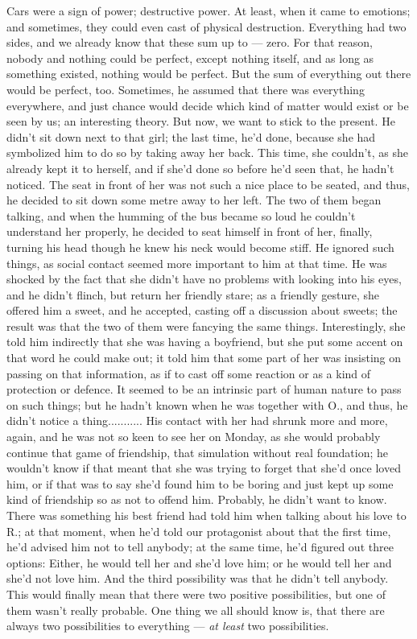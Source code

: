 Cars were a sign of power; destructive power. At least, when it came to emotions; and sometimes, they could even cast of physical destruction. Everything had two sides, and we already know that these sum up to --- zero. 
For that reason, nobody and nothing could be perfect, except nothing itself, and as long as something existed, nothing would be perfect. But the sum of everything out there would be perfect, too. 
Sometimes, he assumed that there was everything everywhere, and just chance would decide which kind of matter would exist or be seen by us; an interesting theory. 
But now, we want to stick to the present. 
He didn't sit down next to that girl; the last time, he'd done, because she had symbolized him to do so by taking away her back. This time, she couldn't, as she already kept it to herself, and if she'd done so before he'd seen that, he hadn't noticed. The seat in front of her was not such a nice place to be seated, and thus, he decided to sit down some metre away to her left. 
The two of them began talking, and when the humming of the bus became so loud he couldn't understand her properly, he decided to seat himself in front of her, finally, turning his head though he knew his neck would become stiff. He ignored such things, as social contact seemed more important to him at that time. He was shocked by the fact that she didn't have no problems with looking into his eyes, and he didn't flinch, but return her friendly stare; as a friendly gesture, she offered him a sweet, and he accepted, casting off a discussion about sweets; the result was that the two of them were fancying the same things. Interestingly, she told him indirectly that she was having a boyfriend, but she put some accent on that word he could make out; it told him that some part of her was insisting on passing on that information, as if to cast off some reaction or as a kind of protection or defence. It seemed to be an intrinsic part of human nature to pass on such things; but he hadn't known when he was together with O., and thus, he didn't notice a thing...........
His contact with her had shrunk more and more, again, and he was not so keen to see her on Monday, as she would probably continue that game of friendship, that simulation without real foundation; he wouldn't know if that meant that she was trying to forget that she'd once loved him, or if that was to say she'd found him to be boring and just kept up some kind of friendship so as not to offend him. 
Probably, he didn't want to know. 
There was something his best friend had told him when talking about his love to R.; at that moment, when he'd told our protagonist about that the first time, he'd advised him not to tell anybody; at the same time, he'd figured out three options: Either, he would tell her and she'd love him; or he would tell her and she'd not love him. And the third possibility was that he didn't tell anybody. This would finally mean that there were two positive possibilities, but one of them wasn't really probable. One thing we all should know is, that there are always two possibilities to everything --- \emph{at least} two possibilities. 
